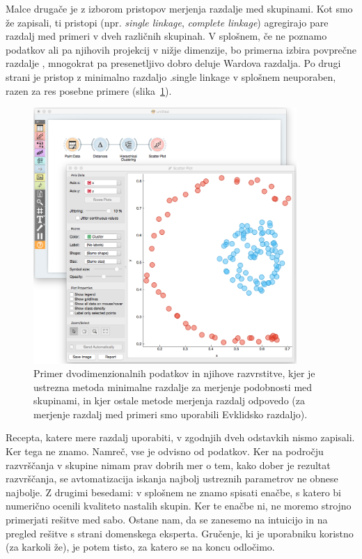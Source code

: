 Malce drugače je z izborom pristopov merjenja razdalje med skupinami. Kot smo že zapisali, ti pristopi (npr. {\em single linkage}, {\em complete linkage}) agregirajo pare razdalj med primeri v dveh različnih skupinah. V splošnem, če ne poznamo podatkov ali pa njihovih projekcij v nižje dimenzije, bo primerna izbira povprečne razdalje , mnogokrat pa presenetljivo dobro deluje Wardova razdalja. Po drugi strani je pristop z minimalno razdaljo \angl.{single linkage} v splošnem neuporaben, razen za res posebne primere (slika~\ref{f-single-linkage}).

\begin{figure}[htbp]
\begin{center}
\includegraphics[width=10cm]{slike/single-linkage.png}
\caption{Primer dvodimenzionalnih podatkov in njihove razvrstitve, kjer je ustrezna metoda minimalne razdalje za merjenje podobnosti med skupinami, in kjer ostale metode merjenja razdalj odpovedo (za merjenje razdalj med primeri smo uporabili Evklidsko razdaljo).}
\label{f-single-linkage}
\end{center}
\end{figure}

Recepta, katere mere razdalj uporabiti, v zgodnjih dveh odstavkih nismo zapisali. Ker tega ne znamo. Namreč, vse je odvisno od podatkov. Ker na področju razvrščanja v skupine nimam prav dobrih mer o tem, kako dober je rezultat razvrščanja, se avtomatizacija iskanja najbolj ustreznih parametrov ne obnese najbolje. Z drugimi besedami: v splošnem ne znamo spisati enačbe, s katero bi numerično ocenili kvaliteto nastalih skupin. Ker te enačbe ni, ne moremo strojno primerjati rešitve med sabo. Ostane nam, da se zanesemo na intuicijo in na pregled rešitve s strani domenskega eksperta. Gručenje, ki je uporabniku koristno (za karkoli že), je potem tisto, za katero se na koncu odločimo.

